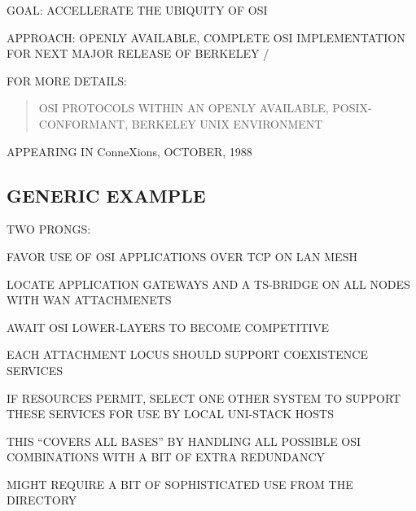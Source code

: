 \begin{bwslide}

\begin{nrtc}
\item	GOAL: ACCELLERATE THE UBIQUITY OF OSI

\item	APPROACH: OPENLY AVAILABLE, COMPLETE OSI IMPLEMENTATION FOR NEXT MAJOR
	RELEASE OF BERKELEY \unix/

\item	FOR MORE DETAILS:
\begin{quote}
OSI PROTOCOLS WITHIN AN OPENLY AVAILABLE, POSIX-CONFORMANT, BERKELEY UNIX
ENVIRONMENT
\end{quote}
APPEARING IN ConneXions, OCTOBER, 1988
\end{nrtc}
\end{bwslide}


\begin{bwslide}
\end{bwslide}


\begin{bwslide}
\end{bwslide}


\begin{bwslide}
\part*	{GENERIC EXAMPLE}\bf

\begin{nrtc}
\item	TWO PRONGS:
    \begin{nrtc}
    \item	FAVOR USE OF OSI APPLICATIONS OVER TCP ON LAN MESH

    \item	LOCATE APPLICATION GATEWAYS AND A TS-BRIDGE ON ALL NODES
		WITH WAN ATTACHMENETS
    \end{nrtc}

\item	AWAIT OSI LOWER-LAYERS TO BECOME COMPETITIVE
\end{nrtc}
\end{bwslide}


\begin{bwslide}

\begin{nrtc}
\item	EACH ATTACHMENT LOCUS SHOULD SUPPORT COEXISTENCE SERVICES

\item	IF RESOURCES PERMIT, SELECT ONE OTHER SYSTEM TO SUPPORT THESE
	SERVICES FOR USE BY LOCAL UNI-STACK HOSTS

\item	THIS ``COVERS ALL BASES'' BY HANDLING ALL POSSIBLE OSI COMBINATIONS
	WITH A BIT OF EXTRA REDUNDANCY

\item	MIGHT REQUIRE A BIT OF SOPHISTICATED USE FROM THE DIRECTORY
\end{nrtc}
\end{bwslide}


